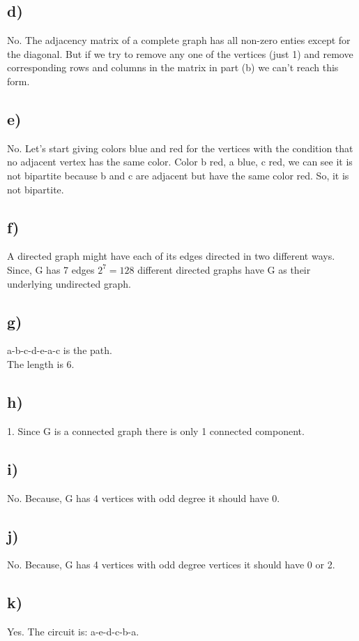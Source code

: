 \documentclass[12pt]{article}
\begin{document}
\subsection*{d) }
No. The adjacency matrix of a complete graph has all non-zero enties except for the diagonal. But if we try to remove any one of the vertices (just 1) and remove corresponding rows and columns in the matrix in part (b) we can't reach this form.

\subsection*{e) }
No. Let's start giving colors blue and red for the vertices with the condition that no adjacent vertex has the same color. Color b red, a blue, c red, we can see it is not bipartite because b and c are adjacent but have the same color red. So, it is not bipartite.

\subsection*{f) }
A directed graph might have each of its edges directed in two different ways. Since, G has 7 edges $2^7=128$ different directed graphs have G as their underlying undirected graph.

\subsection*{g) }
a-b-c-d-e-a-c is the path.\\
The length is 6.

\subsection*{h) }
1. Since G is a connected graph there is only 1 connected component.

\subsection*{i) }
No. Because, G has 4 vertices with odd degree it should have 0.\\

\subsection*{j) }
No. Because, G has 4 vertices with odd degree vertices it should have 0 or 2.

\subsection*{k) }
Yes. The circuit is: a-e-d-c-b-a.
\end{document}
